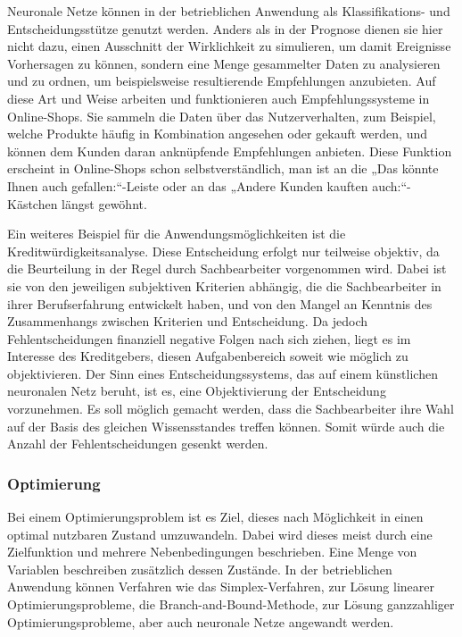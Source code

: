 \documentclass[twoside,a4paper]{article}
\begin{document}
Neuronale Netze können in der betrieblichen Anwendung als Klassifikations- und Entscheidungsstütze genutzt werden. Anders als in der Prognose dienen sie hier nicht dazu, einen Ausschnitt der Wirklichkeit zu simulieren, um damit Ereignisse Vorhersagen zu können, sondern eine Menge gesammelter Daten zu analysieren und zu ordnen, um beispielsweise resultierende Empfehlungen anzubieten. Auf diese Art und Weise arbeiten und funktionieren auch Empfehlungssysteme in Online-Shops. Sie sammeln die Daten über das Nutzerverhalten, zum Beispiel, welche Produkte häufig in Kombination angesehen oder gekauft werden, und können dem Kunden daran anknüpfende Empfehlungen anbieten. Diese Funktion erscheint in Online-Shops schon selbstverständlich, man ist an die „Das könnte Ihnen auch gefallen:“-Leiste oder an das „Andere Kunden kauften auch:“-Kästchen längst gewöhnt.

Ein weiteres Beispiel für die Anwendungsmöglichkeiten ist die Kreditwürdigkeitsanalyse. Diese Entscheidung erfolgt nur teilweise objektiv, da die Beurteilung in der Regel durch Sachbearbeiter vorgenommen wird. Dabei ist sie von den jeweiligen subjektiven Kriterien abhängig, die die Sachbearbeiter in ihrer Berufserfahrung entwickelt haben, und von den Mangel an Kenntnis des Zusammenhangs zwischen Kriterien und Entscheidung. Da jedoch Fehlentscheidungen finanziell negative Folgen nach sich ziehen, liegt es im Interesse des Kreditgebers, diesen Aufgabenbereich soweit wie möglich zu objektivieren. Der Sinn eines Entscheidungssystems, das auf einem künstlichen neuronalen Netz beruht, ist es, eine Objektivierung der Entscheidung vorzunehmen. Es soll möglich gemacht werden, dass die Sachbearbeiter ihre Wahl auf der Basis des gleichen Wissensstandes treffen können. Somit würde auch die Anzahl der Fehlentscheidungen gesenkt werden.

\subsubsection{Optimierung}

Bei einem Optimierungsproblem ist es Ziel, dieses nach Möglichkeit in einen optimal nutzbaren Zustand umzuwandeln. Dabei wird dieses meist durch eine Zielfunktion und mehrere Nebenbedingungen beschrieben. Eine Menge von Variablen beschreiben zusätzlich dessen Zustände. In der betrieblichen Anwendung können Verfahren wie das Simplex-Verfahren, zur Lösung linearer Optimierungsprobleme, die Branch-and-Bound-Methode, zur Lösung ganzzahliger Optimierungsprobleme, aber auch neuronale Netze angewandt werden.
\end{document}
